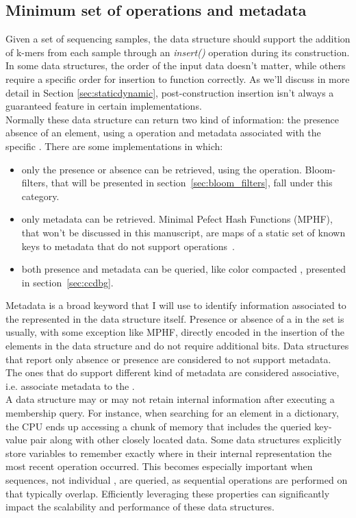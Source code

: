 \subsection{Minimum set of operations and metadata}
Given a set of sequencing samples, the data structure should support the addition of k-mers from each sample through an \emph{insert()}  operation during its construction. In some data structures, the order of the input data doesn't matter, while others require a specific order for insertion to function correctly. As we'll discuss in more detail in Section \ref{sec:staticdynamic}, post-construction insertion isn't always a guaranteed feature in certain implementations.\\
Normally these data structure can return two kind of information: the presence absence of an element, using a \memb operation and metadata associated with the specific \kmer. There are some implementations in which:
\begin{itemize}
	\item only the presence or absence can be retrieved, using the \memb operation. Bloom-filters, that will be presented in section~\ref{sec:bloom_filters}, fall under this category.
	\item only metadata can be retrieved. Minimal Pefect Hash Functions (MPHF), that won't be discussed in this manuscript, are maps of a static set of known keys to metadata that do not support \memb operations~\cite{mphf}.
	\item both presence and metadata can be queried, like color compacted \dbg, presented in section~\ref{sec:ccdbg}.
\end{itemize}
Metadata is a broad keyword that I will use to identify information associated to the \kmers represented in the data structure itself. Presence or absence of a \kmer in the set is usually, with some exception like \gls{MPHF}, directly encoded in the insertion of the elements in the data structure and do not require additional bits. Data structures that report only absence or presence are considered to not support metadata. The ones that do support different kind of metadata are considered associative, i.e. associate metadata to the \kmers.\\
A data structure may or may not retain internal information after executing a membership query. For instance, when searching for an element in a dictionary, the CPU ends up accessing a chunk of memory that includes the queried key-value pair along with other closely located data. Some data structures explicitly store variables to remember exactly where in their internal representation the most recent \memb operation occurred. This becomes especially important when sequences, not individual \kmers, are queried, as sequential \memb operations are performed on \kmers that typically overlap. Efficiently leveraging these properties can significantly impact the scalability and performance of these data structures.

